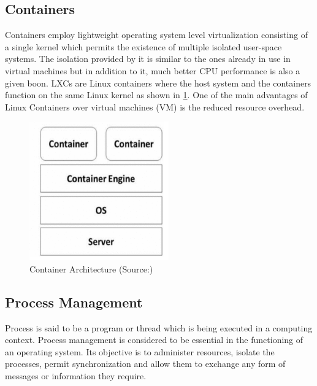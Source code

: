 \documentclass[conference]{IEEEtran}
\begin{document}
\subsection{Containers}
\label{subsec: 1a.containers}
Containers employ lightweight operating system level virtualization consisting of a single kernel which permits the existence of multiple isolated user-space systems\cite{Dua2014VirtualizationPaaS}. The isolation provided by it is similar to the ones already in use in virtual machines but in addition to it, much better CPU performance is also a given boon. LXCs are Linux containers where the host system and the containers function on the same Linux kernel as shown in \ref{fig 1: Container}. One of the main advantages of Linux Containers over virtual machines (VM) is the reduced resource overhead. \cite{Dua2014VirtualizationPaaS}

\begin{figure}[h!]
 \centering
 \includegraphics[width = 6cm]{Container.png}
 \caption{Container Architecture (Source:\cite{Ann2015PerformanceMachines})}
 \label{fig 1: Container}
\end{figure}


\subsection{Process Management} 
\label{subsec: 1b.process management}
Process is said to be a program or thread which is being executed in a computing context. Process management is considered to be essential in the functioning of an operating system. Its objective is to administer resources, isolate the processes, permit synchronization and allow them to exchange any form of messages or information they require. 
\end{document}
